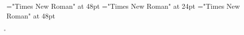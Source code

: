 \font\nameletData="Times New Roman" at 48pt
\font\slotnameletData="Times New Roman" at 24pt
\font{}="Times New Roman" at 48pt
 \r\n
{}

\bye
